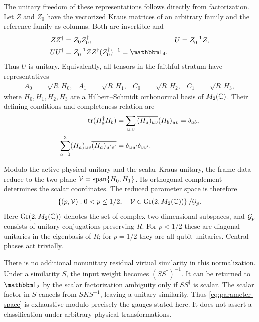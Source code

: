 The unitary freedom of these representations follows directly from
factorization. Let $Z$ and $Z_0$ have the vectorized Kraus matrices
of an arbitrary family and the reference family as columns.
Both are invertible and
\begin{align}
	ZZ^\dagger & =Z_0Z_0^\dagger,
	           &
	U          & =Z_0^{-1}Z,
	\nonumber                                          \\
	UU^\dagger
	           & =Z_0^{-1}ZZ^\dagger(Z_0^\dagger)^{-1}
	=\Id_4.
\end{align}
Thus $U$ is unitary. Equivalently, all tensors in the faithful
stratum have representatives
\begin{align}
	A_0 & =\sqrt R\,H_0,
	    &
	A_1 & =\sqrt R\,H_1,
	    &
	C_0 & =\sqrt R\,H_2,
	    &
	C_1 & =\sqrt R\,H_3,
	\label{eq:frame-param}
\end{align}
where $H_0,H_1,H_2,H_3$ are a Hilbert--Schmidt orthonormal basis of
$M_2(\mathbb{C})$. Their defining conditions and completeness relation are
\begin{align}
	\operatorname{tr}(H_a^\dagger H_b)
	 & =\sum_{u,v}\overline{(H_a)_{uv}}(H_b)_{uv}
	=\delta_{ab},
	\nonumber                                     \\
	\sum_{a=0}^3(H_a)_{uv}\overline{(H_a)_{u'v'}}
	 & =\delta_{uu'}\delta_{vv'}.
	\label{eq:frame-equations}
\end{align}

Modulo the active physical unitary and the scalar Kraus unitary,
the frame data reduce to the two-plane
$\mathcal{V}=\operatorname{span}\{H_0,H_1\}$.
Its orthogonal complement determines the scalar coordinates.
The reduced parameter space is therefore
\begin{align}
	\left\{(p,\mathcal{V}):
	0<p\leq1/2,\quad
	\mathcal{V}\in\operatorname{Gr}(2,M_2(\mathbb{C}))\right\}/\mathcal{G}_p.
	\label{eq:parameter-space}
\end{align}
Here $\operatorname{Gr}(2,M_2(\mathbb{C}))$ denotes the set of complex
two-dimensional subspaces, and $\mathcal{G}_p$ consists of unitary
conjugations preserving $R$. For $p<1/2$ these are diagonal
unitaries in the eigenbasis of $R$; for $p=1/2$ they are all
qubit unitaries. Central phases act trivially.

There is no additional nonunitary residual virtual similarity in
this normalization. Under a similarity $S$, the input weight becomes
$(SS^\dagger)^{-1}$. It can be returned to $\Id_2$ by the scalar
factorization ambiguity only if $SS^\dagger$ is scalar. The scalar
factor in $S$ cancels from $SKS^{-1}$, leaving a unitary similarity.
Thus \cref{eq:parameter-space} is exhaustive modulo precisely the
gauges stated here. It does not assert a classification under
arbitrary physical transformations.

